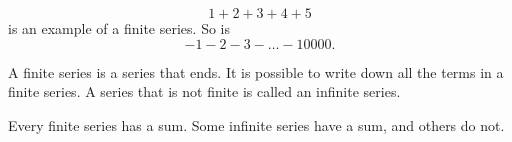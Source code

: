 \begin{frame}
\begin{example}
\[
1 + 2 + 3 + 4 + 5
\]
is an example of a finite series.  So is
\[
-1 - 2 - 3 - \ldots - 10 000.
\]
\end{example}

\begin{definition}
A finite series is a series that ends.  
It is possible to write down all the terms in a finite series.  
A series that is not finite is called an infinite series.  

Every finite series has a sum.  
Some infinite series have a sum, and others do not.  
\end{definition}

%

\end{frame}
